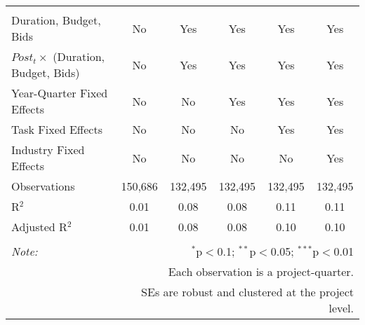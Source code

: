 \documentclass[
]{article}
\begin{document}
\begin{table}[H]
\begin{tabular}{@{\extracolsep{-2pt}}lccccc}
\hline \\[-1.8ex] 
Duration, Budget, Bids & No & Yes & Yes & Yes & Yes \\ 
$Post_t \times $  (Duration, Budget, Bids) & No & Yes & Yes & Yes & Yes \\ 
Year-Quarter Fixed Effects & No & No & Yes & Yes & Yes \\ 
Task Fixed Effects & No & No & No & Yes & Yes \\ 
Industry Fixed Effects & No & No & No & No & Yes \\ 
Observations & 150,686 & 132,495 & 132,495 & 132,495 & 132,495 \\ 
R$^{2}$ & 0.01 & 0.08 & 0.08 & 0.11 & 0.11 \\ 
Adjusted R$^{2}$ & 0.01 & 0.08 & 0.08 & 0.10 & 0.10 \\ 
\hline 
\hline \\[-1.8ex] 
\textit{Note:}  & \multicolumn{5}{r}{$^{*}$p$<$0.1; $^{**}$p$<$0.05; $^{***}$p$<$0.01} \\ 
 & \multicolumn{5}{r}{Each observation is a project-quarter.} \\ 
 & \multicolumn{5}{r}{SEs are robust and clustered at the project level.} \\ 
\end{tabular} 
\end{table}
\end{document}
